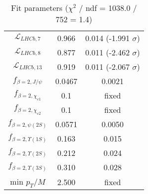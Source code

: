 \begin{table}[h!]
\begin{tabular}{c|c|c}
$\mathcal L_{LHCb,7}$ & 0.966 & 0.014 (-1.991 $\sigma$) \\
$\mathcal L_{LHCb,8}$ & 0.877 & 0.011 (-2.462 $\sigma$) \\
$\mathcal L_{LHCb,13}$ & 0.919 & 0.011 (-2.067 $\sigma$) \\
$f_{\beta=2,J/\psi}$ & 0.0467 & 0.0021 \\
$f_{\beta=2,\chi_{c1}}$ & 0.1 & fixed \\
$f_{\beta=2,\chi_{c2}}$ & 0.1 & fixed \\
$f_{\beta=2,\psi(2S)}$ & 0.0571 & 0.0050 \\
$f_{\beta=2,\Upsilon(1S)}$ & 0.163 & 0.015 \\
$f_{\beta=2,\Upsilon(2S)}$ & 0.212 & 0.024 \\
$f_{\beta=2,\Upsilon(3S)}$ & 0.310 & 0.028 \\
min $p_T/M$ & 2.500 & fixed \\
\end{tabular}
\caption{Fit parameters ($\chi^2$ / ndf = 1038.0 / 752 = 1.4)}
\end{table}
